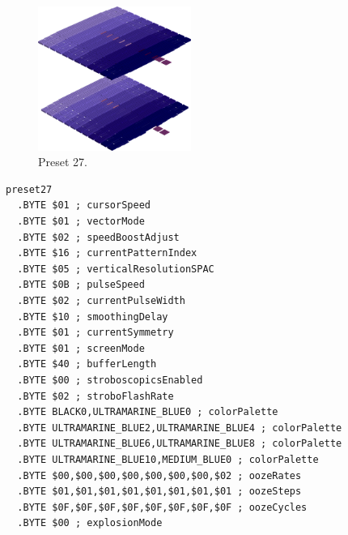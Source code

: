 \clearpage
\begin{minipage}[b]{0.48\linewidth}
\begin{figure}[H]                                                          
  \centering                                                             
  \begin{adjustbox}{width=5cm,center}                                   
  \includegraphics[width=5cm]{src/colorspace_presets/preset27-45.png}%
  \end{adjustbox}                                                        
\caption*{Preset 27.}                                           
\end{figure}                                                               
\end{minipage}
\hspace{0.1cm}
\begin{minipage}[b]{0.48\linewidth}                            
\begin{lstlisting}[basicstyle=\ttfamily\tiny]
preset27
  .BYTE $01 ; cursorSpeed
  .BYTE $01 ; vectorMode
  .BYTE $02 ; speedBoostAdjust
  .BYTE $16 ; currentPatternIndex
  .BYTE $05 ; verticalResolutionSPAC
  .BYTE $0B ; pulseSpeed
  .BYTE $02 ; currentPulseWidth
  .BYTE $10 ; smoothingDelay
  .BYTE $01 ; currentSymmetry
  .BYTE $01 ; screenMode
  .BYTE $40 ; bufferLength
  .BYTE $00 ; stroboscopicsEnabled
  .BYTE $02 ; stroboFlashRate
  .BYTE BLACK0,ULTRAMARINE_BLUE0 ; colorPalette
  .BYTE ULTRAMARINE_BLUE2,ULTRAMARINE_BLUE4 ; colorPalette
  .BYTE ULTRAMARINE_BLUE6,ULTRAMARINE_BLUE8 ; colorPalette
  .BYTE ULTRAMARINE_BLUE10,MEDIUM_BLUE0 ; colorPalette
  .BYTE $00,$00,$00,$00,$00,$00,$00,$02 ; oozeRates
  .BYTE $01,$01,$01,$01,$01,$01,$01,$01 ; oozeSteps
  .BYTE $0F,$0F,$0F,$0F,$0F,$0F,$0F,$0F ; oozeCycles
  .BYTE $00 ; explosionMode
\end{lstlisting}
\end{minipage}

\vspace*{-0.1cm}

